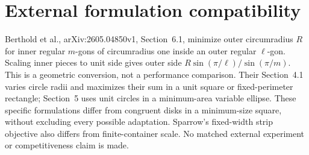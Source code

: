 \documentclass[11pt]{article}
\begin{document}
\section{External formulation compatibility}
Berthold et al., arXiv:2605.04850v1, Section~6.1, minimize outer circumradius $R$ for inner regular $m$-gons of circumradius one inside an outer regular $\ell$-gon. Scaling inner pieces to unit side gives outer side $R\sin(\pi/\ell)/\sin(\pi/m)$. This is a geometric conversion, not a performance comparison. Their Section~4.1 varies circle radii and maximizes their sum in a unit square or fixed-perimeter rectangle; Section~5 uses unit circles in a minimum-area variable ellipse. These specific formulations differ from congruent disks in a minimum-size square, without excluding every possible adaptation. Sparrow's fixed-width strip objective also differs from finite-container scale. No matched external experiment or competitiveness claim is made.
\end{document}
